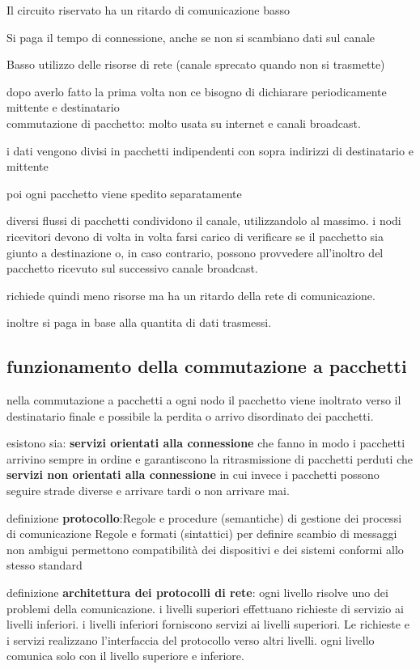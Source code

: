 \documentclass[12pt]{article}
\begin{document}
Il circuito riservato ha un ritardo di comunicazione basso

Si paga il tempo di connessione, anche se non si scambiano dati sul canale

Basso utilizzo delle risorse di rete (canale sprecato quando non si trasmette)

dopo averlo fatto la prima volta non ce bisogno di dichiarare periodicamente mittente e destinatario
\\
commutazione di pacchetto: molto usata su internet e canali broadcast.

i dati vengono divisi in pacchetti indipendenti con sopra indirizzi di destinatario e mittente

poi ogni pacchetto viene spedito separatamente

diversi flussi di pacchetti condividono il canale, utilizzandolo al massimo. i nodi ricevitori devono di volta in volta
farsi carico di verificare se il pacchetto sia giunto a destinazione o, in caso contrario, possono provvedere all’inoltro del
pacchetto ricevuto sul successivo canale broadcast.

richiede quindi meno risorse ma ha un ritardo della rete di comunicazione.

inoltre  si paga in base alla quantita di dati trasmessi.

\subsection{funzionamento della commutazione a pacchetti}

nella commutazione a pacchetti a ogni nodo il pacchetto viene inoltrato verso il destinatario finale e possibile la perdita o arrivo disordinato dei pacchetti.

esistono sia: \textbf{servizi orientati alla connessione} che fanno in modo i pacchetti arrivino sempre in ordine e garantiscono la ritrasmissione di pacchetti perduti
che \textbf{servizi non orientati alla connessione} in cui invece i pacchetti possono seguire strade diverse e arrivare tardi o non arrivare mai.

definizione \textbf{protocollo}:Regole e procedure (semantiche) di gestione dei processi di comunicazione
 Regole e formati (sintattici) per definire scambio di messaggi non ambigui
 permettono compatibilità dei dispositivi e dei sistemi conformi allo stesso standard

 definizione \textbf{architettura dei protocolli di rete}:
 ogni livello risolve uno dei problemi della comunicazione.
 i livelli superiori effettuano richieste di servizio ai livelli inferiori.
i livelli inferiori forniscono servizi ai livelli superiori.
Le richieste e i servizi realizzano l’interfaccia del protocollo verso altri livelli.
ogni livello comunica solo con il livello superiore e inferiore.
\end{document}
